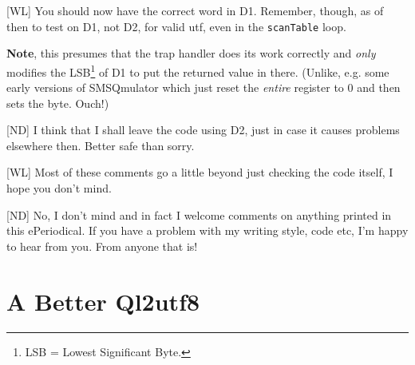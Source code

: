 [WL] You should now have the correct word in D1. Remember, though, as of then to test on D1, not D2, for valid utf, even in the \texttt{scanTable} loop.

\textbf{Note}, this presumes that the trap handler does its work correctly and \emph{only} modifies the LSB\footnote{LSB = Lowest Significant Byte.} of D1 to put the returned value in there. (Unlike, e.g. some early versions of SMSQmulator which just reset the \emph{entire} register to 0 and then sets the byte. Ouch!)

[ND] I think that I shall leave the code using D2, just in case it causes problems elsewhere then. Better safe than sorry.
	
[WL] Most of these comments go a little beyond just checking the code itself, I hope you don't mind.

[ND] No, I don't mind and in fact I welcome comments on anything printed in this ePeriodical. If you have a problem with my writing style, code etc, I'm happy to hear from you. From anyone that is!

\section{A Better Ql2utf8}

